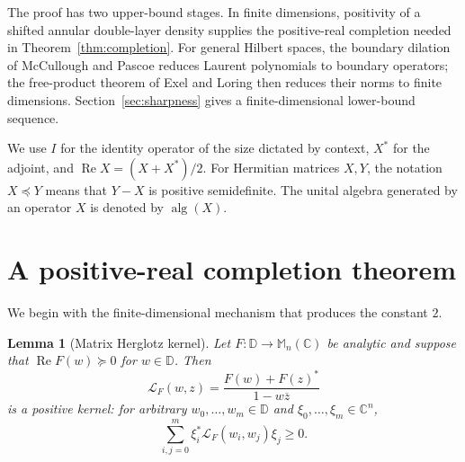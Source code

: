 \documentclass[preprints,article,submit,oneauthor]{Definitions/mdpi}
\newcounter{manuscriptresult}[section]
\theoremstyle{mdpi}
\newtheorem{lemma}[manuscriptresult]{Lemma}
\theoremstyle{definition}
\newcommand{\C}{\mathbb C}
\newcommand{\D}{\mathbb D}
\newcommand{\Mn}{\mathbb M_n(\C)}
\newcommand{\alg}{\operatorname{alg}}
\newcommand{\RePart}{\operatorname{Re}}
\begin{document}
The proof has two upper-bound stages.  In finite dimensions, positivity
of a shifted annular double-layer density supplies the positive-real
completion needed in Theorem~\ref{thm:completion}.  For general Hilbert
spaces, the boundary dilation of McCullough and Pascoe
\cite[Theorem~1.1(c)]{McCulloughPascoe2023} reduces Laurent polynomials
to boundary operators; the free-product theorem of Exel and Loring
\cite[Theorem~3.2]{ExelLoring1992} then reduces their norms to finite
dimensions.  Section~\ref{sec:sharpness} gives a finite-dimensional
lower-bound sequence.

We use $I$ for the identity operator of the size dictated by context,
$X^*$ for the adjoint, and
$\RePart X=(X+X^*)/2$.  For Hermitian matrices $X,Y$, the notation
$X\preceq Y$ means that $Y-X$ is positive semidefinite.  The unital
algebra generated by an operator $X$ is denoted by $\alg(X)$.

\section{A positive-real completion theorem}
\label{sec:completion}

We begin with the finite-dimensional mechanism that produces the
constant $2$.

\begin{lemma}[Matrix Herglotz kernel]
\label{lem:herglotz-kernel}
Let $F\colon\D\to\Mn$ be analytic and suppose that
$\RePart F(w)\succeq0$ for $w\in\D$.  Then
\begin{equation}
  \mathcal L_F(w,z)
  =\frac{F(w)+F(z)^*}{1-w\overline z}
  \label{eq:Herglotz-kernel}
\end{equation}
is a positive kernel: for arbitrary
$w_0,\ldots,w_m\in\D$ and $\xi_0,\ldots,\xi_m\in\C^n$,
\begin{equation}
  \sum_{i,j=0}^m
  \xi_i^*\mathcal L_F(w_i,w_j)\xi_j\geq0.
  \label{eq:kernel-positive}
\end{equation}
\end{lemma}
\end{document}
